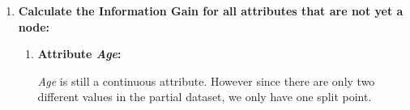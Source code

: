 \documentclass[
english,
smallborders
]{i6prcsht}
\newcommand{\OfSpecificValue}[3]{_{\text{\tiny #1#2#3}}}
\begin{document}
\begin{solution}
\begin{enumerate}
\begin{enumerate}
\begin{enumerate}
				                  \begin{alignat*}{2}
					                  \text{Info}(D\OfSpecificValue{Parti}{=}{Medium}) & = -\sum_{i=1}^{m}p_i \log_2(p_i)                                                                                                                          \\
					                                                                   & = -p\OfSpecificValue{Passed}{=}{Yes} \log_2(p\OfSpecificValue{Passed}{=}{Yes})- p\OfSpecificValue{Passed}{=}{No} \log_2(p\OfSpecificValue{Passed}{=}{No}) \\
					                                                                   & = -\frac{1}{2} \log_2\left(\frac{1}{2}\right) - \frac{1}{2} \log_2\left(\frac{1}{2}\right)                                                                \\
					                                                                   & = 1                                                                                                                                                       \\
				                  \end{alignat*}
				                  
				            \item \textbf{Calculate the Information Gain for all attributes that are not yet a node:}
				                  
				                  \begin{enumerate}	
					                  \item \textbf{Attribute \textit{Age}:}
					                        
					                        \textit{Age} is still a continuous attribute. However since there are only two different values in the partial dataset, we only have one split point.
					                        

\end{enumerate}
\end{enumerate}
\end{enumerate}
\end{enumerate}
\end{solution}
\end{document}
